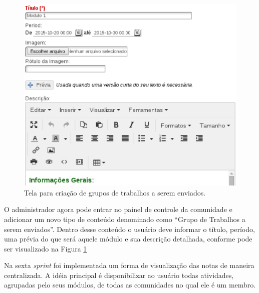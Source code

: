 \begin{figure}[h]
    \centering
    \includegraphics[keepaspectratio=true,scale=0.6]
      {figuras/work-assignment-group.eps}
    \caption{Tela para criação de grupos de trabalhos a serem enviados.}
    \label{fig:work-assignment-group}
\end{figure}

O administrador agora pode entrar no painel de controle da comunidade e adicionar um novo tipo de conteúdo denominado como ``Grupo de Trabalhos a serem enviados''. Dentro desse conteúdo o usuário deve informar o título, período, uma prévia do que será aquele módulo e sua descrição detalhada, conforme pode ser visualizado na Figura \ref{fig:work-assignment-group}




Na sexta \textit{sprint} foi implementada um forma de visualização das notas de maneira centralizada. A idéia principal é disponibilizar ao usuário todas atividades, agrupadas pelo seus módulos, de todas as comunidades no qual ele é um membro.

